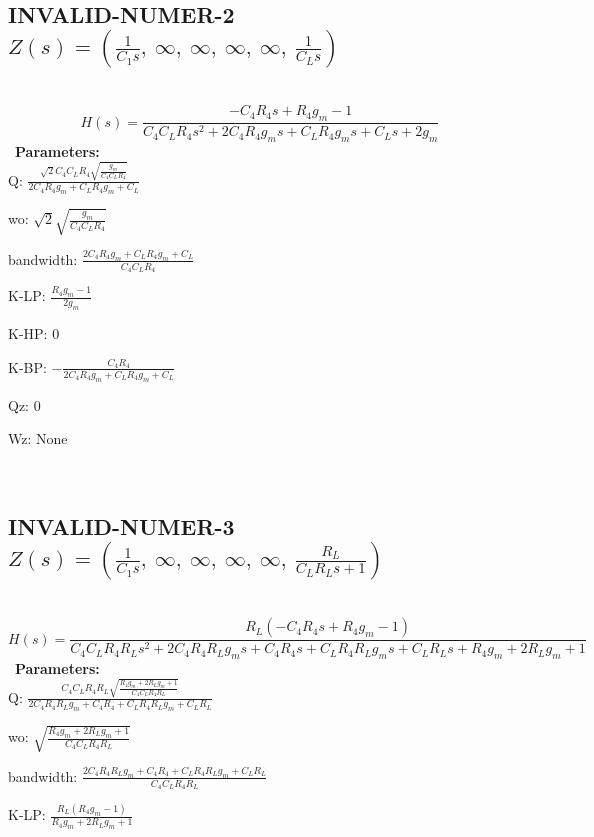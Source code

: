 \documentclass{article}
\begin{document}
\ 

\subsection{INVALID-NUMER-2 $Z(s) = \left( \frac{1}{C_{1} s}, \  \infty, \  \infty, \  \infty, \  \infty, \  \frac{1}{C_{L} s}\right)$ } \ 
\textbf{\[H(s) = \frac{- C_{4} R_{4} s + R_{4} g_{m} - 1}{C_{4} C_{L} R_{4} s^{2} + 2 C_{4} R_{4} g_{m} s + C_{L} R_{4} g_{m} s + C_{L} s + 2 g_{m}}\] } \ 
\textbf{Parameters:}\\ 

Q: $\frac{\sqrt{2} C_{4} C_{L} R_{4} \sqrt{\frac{g_{m}}{C_{4} C_{L} R_{4}}}}{2 C_{4} R_{4} g_{m} + C_{L} R_{4} g_{m} + C_{L}}$\ 

wo: $\sqrt{2} \sqrt{\frac{g_{m}}{C_{4} C_{L} R_{4}}}$\ 

bandwidth: $\frac{2 C_{4} R_{4} g_{m} + C_{L} R_{4} g_{m} + C_{L}}{C_{4} C_{L} R_{4}}$\ 

K-LP: $\frac{R_{4} g_{m} - 1}{2 g_{m}}$\ 

K-HP: $0$\ 

K-BP: $- \frac{C_{4} R_{4}}{2 C_{4} R_{4} g_{m} + C_{L} R_{4} g_{m} + C_{L}}$\ 

Qz: $0$\ 

Wz: $\text{None}$\ 

\ 

\subsection{INVALID-NUMER-3 $Z(s) = \left( \frac{1}{C_{1} s}, \  \infty, \  \infty, \  \infty, \  \infty, \  \frac{R_{L}}{C_{L} R_{L} s + 1}\right)$ } \ 
\textbf{\[H(s) = \frac{R_{L} \left(- C_{4} R_{4} s + R_{4} g_{m} - 1\right)}{C_{4} C_{L} R_{4} R_{L} s^{2} + 2 C_{4} R_{4} R_{L} g_{m} s + C_{4} R_{4} s + C_{L} R_{4} R_{L} g_{m} s + C_{L} R_{L} s + R_{4} g_{m} + 2 R_{L} g_{m} + 1}\] } \ 
\textbf{Parameters:}\\ 

Q: $\frac{C_{4} C_{L} R_{4} R_{L} \sqrt{\frac{R_{4} g_{m} + 2 R_{L} g_{m} + 1}{C_{4} C_{L} R_{4} R_{L}}}}{2 C_{4} R_{4} R_{L} g_{m} + C_{4} R_{4} + C_{L} R_{4} R_{L} g_{m} + C_{L} R_{L}}$\ 

wo: $\sqrt{\frac{R_{4} g_{m} + 2 R_{L} g_{m} + 1}{C_{4} C_{L} R_{4} R_{L}}}$\ 

bandwidth: $\frac{2 C_{4} R_{4} R_{L} g_{m} + C_{4} R_{4} + C_{L} R_{4} R_{L} g_{m} + C_{L} R_{L}}{C_{4} C_{L} R_{4} R_{L}}$\ 

K-LP: $\frac{R_{L} \left(R_{4} g_{m} - 1\right)}{R_{4} g_{m} + 2 R_{L} g_{m} + 1}$\ 
\end{document}
